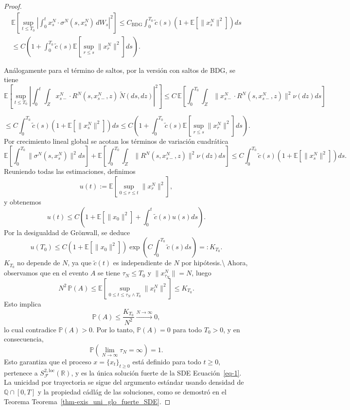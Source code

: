 \documentclass[
  spanish,
  us-letterpaper,
]{scrreprt}
\theoremstyle{plain}
\theoremstyle{plain}
\theoremstyle{definition}
\theoremstyle{remark}
\begin{document}
\begin{proof}
\begin{align*}
\mathbb{E}\left[ \sup_{t \leq T_0} \left| \int_0^t x_s^N \cdot \sigma^N(s,x_s^N)\,dW_s \right|^2 \right]
\leq C_{\mathrm{BDG}} \int_0^{T_0} \tilde{c}(s)\left(1 + \mathbb{E}[\|x_s^N\|^2]\right) ds\\
\leq C\left(1 + \int_0^{T_0} \tilde{c}(s) \mathbb{E}\left[ \sup_{r \leq s} \|x_r^N\|^2 \right] ds\right).
\end{align*}

Análogamente para el término de saltos, por la versión con saltos de
BDG, se tiene
\[\mathbb{E}\left[ \sup_{t \leq T_0} \left| \int_0^t \int_Z x_{s-}^N \cdot R^N(s,x_{s-}^N,z)\,\tilde{N}(ds,dz) \right|^2 \right]
\leq C \, \mathbb{E}\left[ \int_0^{T_0} \int_Z \|x_{s-}^N \cdot R^N(s,x_{s-}^N,z)\|^2 \nu(dz) ds \right]\]

\[\leq C \int_0^{T_0} \tilde{c}(s)\left(1 + \mathbb{E}[\|x_s^N\|^2]\right) ds
\leq C\left(1 + \int_0^{T_0} \tilde{c}(s) \mathbb{E}\left[ \sup_{r \leq s} \|x_r^N\|^2 \right] ds\right).\]
Por crecimiento lineal global se acotan los términos de variación
cuadrática
\[\mathbb{E}\left[ \int_0^{T_0} \|\sigma^N(s,x_s^N)\|^2 ds \right] + \mathbb{E}\left[ \int_0^{T_0} \int_Z \|R^N(s,x_{s-}^N,z)\|^2 \nu(dz) ds \right]
\leq C \int_0^{T_0} \tilde{c}(s)\left(1 + \mathbb{E}[\|x_s^N\|^2]\right) ds.\]
Reuniendo todas las estimaciones, definimos
\[u(t) := \mathbb{E}\left[ \sup_{0 \leq r \leq t} \|x_r^N\|^2 \right],\]
y obtenemos
\[u(t) \leq C \left( 1 + \mathbb{E}[\|x_0\|^2] + \int_0^t \tilde{c}(s) u(s) ds \right).\]
Por la desigualdad de Grönwall, se deduce
\[u(T_0) \leq C\left(1 + \mathbb{E}[\|x_0\|^2]\right) \exp\!\left( C \int_0^{T_0} \tilde{c}(s) ds \right) =: K_{T_0}.\]
\(K_{T_0}\) no depende de \(N\), ya que \(\tilde{c}(t)\) es
independiente de \(N\) por hipótesis.\textbackslash{} Ahora, observamos
que en el evento \(A\) se tiene \(\tau_N \leq T_0\) y
\(\|x^N_{\tau_N}\| = N\), luego
\[N^2 \, \mathbb{P}(A) \leq \mathbb{E}\left[ \sup_{0 \leq t \leq \tau_N \wedge T_0} \|x^N_t\|^2 \right] \leq K_{T_0}.\]
Esto implica
\[\mathbb{P}(A) \leq \frac{K_{T_0}}{N^2} \xrightarrow{N \to \infty} 0,\]
lo cual contradice \(\mathbb{P}(A) > 0\). Por lo tanto,
\(\mathbb{P}(A) = 0\) para todo \(T_0 > 0\), y en consecuencia,
\[\mathbb{P}\!\left( \lim_{N \to \infty} \tau_N = \infty \right) = 1.\]
Esto garantiza que el proceso \(x = \{x_t\}_{t \geq 0}\) está definido
para todo \(t \geq 0\), pertenece a
\(S^{2,\mathrm{loc}}_{\mathcal{F}}(\mathbb{R})\), y es la única solución
fuerte de la SDE Ecuación~\ref{eq-1}. La unicidad por trayectoria se
sigue del argumento estándar usando densidad de
\(\mathbb{Q} \cap [0,T]\) y la propiedad cádlág de las soluciones, como
se demostró en el Teorema Teorema~\ref{thm-exis_uni_glo_fuerte_SDE}.
\end{proof}
\end{document}

